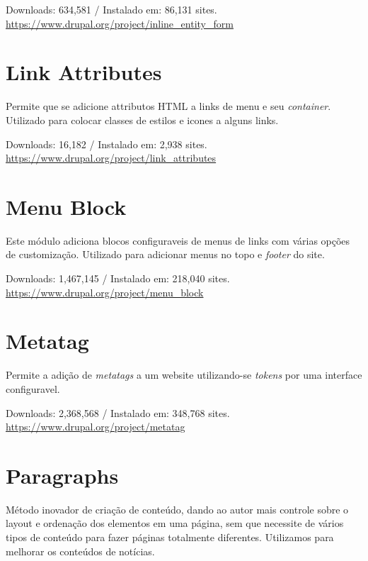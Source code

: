 \begin{center}
  Downloads: 634,581 / Instalado em: 86,131 sites. \\
  \url{https://www.drupal.org/project/inline_entity_form}
\end{center}

\section{Link Attributes}
Permite que se adicione attributos HTML a links de menu e seu \textit{container}.
Utilizado para colocar classes de estilos e icones a alguns links.

\begin{center}
  Downloads: 16,182 / Instalado em: 2,938 sites. \\
  \url{https://www.drupal.org/project/link_attributes}
\end{center}

\section{Menu Block}
Este módulo adiciona blocos configuraveis de menus de links com várias opções de customização. Utilizado para adicionar menus no topo e \textit{footer} do site.

\begin{center}
  Downloads: 1,467,145 / Instalado em: 218,040 sites. \\
  \url{https://www.drupal.org/project/menu_block}
\end{center}

\section{Metatag}
Permite a adição de \textit{metatags} a um website utilizando-se \textit{tokens} por uma interface configuravel.

\begin{center}
  Downloads: 2,368,568 / Instalado em: 348,768 sites. \\
  \url{https://www.drupal.org/project/metatag}
\end{center}

\section{Paragraphs}
Método inovador de criação de conteúdo, dando ao autor mais controle sobre o layout e ordenação dos elementos em uma página, sem que necessite de vários tipos de conteúdo para fazer páginas totalmente diferentes. Utilizamos para melhorar os conteúdos de notícias. 

